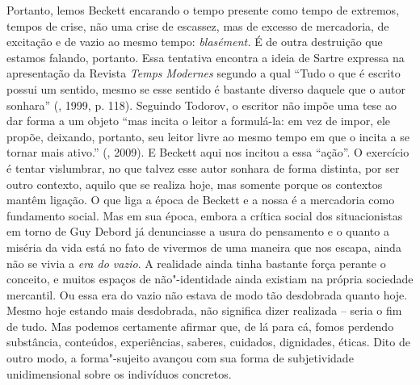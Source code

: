 Portanto, lemos Beckett encarando o tempo presente como tempo de
extremos, tempos de crise, não uma crise de escassez, mas de excesso de
mercadoria, de excitação e de vazio ao mesmo tempo: \emph{blasément.} É
de outra destruição que estamos falando, portanto. Essa tentativa
encontra a ideia de Sartre expressa na apresentação da Revista
\emph{Temps} \emph{Modernes} segundo a qual ``Tudo o que é escrito
possui um sentido, mesmo se esse sentido é bastante diverso daquele que
o autor sonhara'' (, 1999, p. 118). Seguindo Todorov, o escritor
não impõe uma tese ao dar forma a um objeto ``mas incita o leitor a
formulá-la: em vez de impor, ele propõe, deixando, portanto, seu leitor
livre ao mesmo tempo em que o incita a se tornar mais ativo.'' (,
2009). E Beckett aqui nos incitou a essa ``ação''. O exercício é tentar
vislumbrar, no que talvez esse autor sonhara de forma distinta, por ser
outro contexto, aquilo que se realiza hoje, mas somente porque os
contextos mantêm ligação. O que liga a época de Beckett e a nossa é a
mercadoria como fundamento social. Mas em sua época, embora a crítica
social dos situacionistas em torno de Guy Debord já denunciasse a usura
do pensamento e o quanto a miséria da vida está no fato de vivermos de
uma maneira que nos escapa, ainda não se vivia a \emph{era do vazio}. A
realidade ainda tinha bastante força perante o conceito, e muitos
espaços de não"-identidade ainda existiam na própria sociedade mercantil.
Ou essa era do vazio não estava de modo tão desdobrada quanto hoje.
Mesmo hoje estando mais desdobrada, não significa dizer realizada --
seria o fim de tudo. Mas podemos certamente afirmar que, de lá para cá,
fomos perdendo substância, conteúdos, experiências, saberes, cuidados,
dignidades, éticas. Dito de outro modo, a forma"-sujeito avançou com sua
forma de subjetividade unidimensional sobre os indivíduos concretos.

